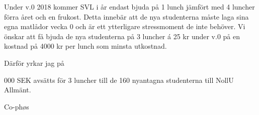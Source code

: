 \documentclass[../_main/handlingar.tex]{subfiles}
\begin{document}
Under v.0 2018 kommer SVL i år endast bjuda på 1 lunch jämfört med 4 luncher förra året och en frukost. Detta innebär att de nya studenterna måste laga sina egna matlådor vecka 0 och är ett ytterligare stressmoment de inte behöver. Vi önskar att få bjuda de nya studenterna på 3 luncher á 25 kr under v.0 på en kostnad på 4000 kr per lunch som minsta utkostnad.

Därför yrkar jag på
\begin{attsatser}
     000 SEK avsätts för 3 luncher till de 160 nyantagna studenterna till NollU Allmänt.
\end{attsatser}


\begin{signatures}{1}
    \mvh
    \signature{Björn Fridqvist Nimvik}{Co-phøs}
\end{signatures}
\end{document}
